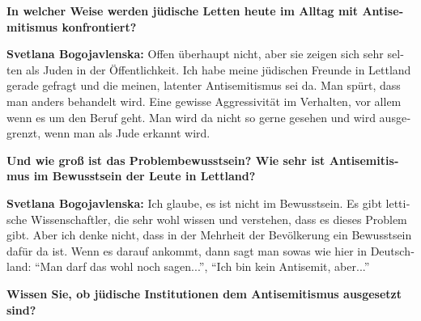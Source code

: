 \begin{otherlanguage}{ngerman}
\textbf{In welcher Weise werden jüdische Letten heute im Alltag mit Antisemitismus konfrontiert?}

\textbf{Svetlana Bogojavlenska:} Offen überhaupt nicht, aber sie zeigen sich sehr selten als Juden in der Öffentlichkeit. Ich habe meine jüdischen Freunde in Lettland gerade gefragt und die meinen, latenter Antisemitismus sei da. Man spürt, dass man anders behandelt wird. Eine gewisse Aggressivität im Verhalten, vor allem wenn es um den Beruf geht. Man wird da nicht so gerne gesehen und wird ausgegrenzt, wenn man als Jude erkannt wird. 

\textbf{Und wie groß ist das Problembewusstsein? Wie sehr ist Antisemitismus im Bewusstsein der Leute in Lettland?}

\textbf{Svetlana Bogojavlenska:} Ich glaube, es ist nicht im Bewusstsein. Es gibt lettische Wissenschaftler, die sehr wohl wissen und verstehen, dass es dieses Problem gibt. Aber ich denke nicht, dass in der Mehrheit der Bevölkerung ein Bewusstsein dafür da ist. Wenn es darauf ankommt, dann sagt man sowas wie hier in Deutschland: "`Man darf das wohl noch sagen..."', "`Ich bin kein Antisemit, aber..."' 

\textbf{Wissen Sie, ob jüdische Institutionen dem Antisemitismus ausgesetzt sind?}


\end{otherlanguage}
